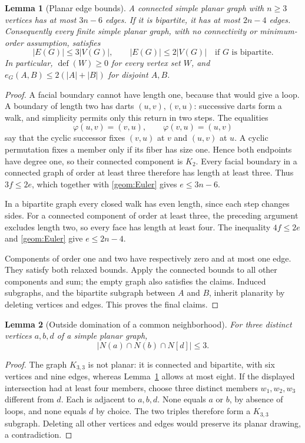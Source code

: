 \documentclass[11pt,a4paper]{article}
\newtheorem{lemma}[lemma]{Lemma}
\theoremstyle{definition}
\theoremstyle{remark}
\DeclareMathOperator{\Def}{def}
\begin{document}
\begin{lemma}[Planar edge bounds]\label{geom:edge-bounds}
A connected simple planar graph with $n\geq3$ vertices has at most $3n-6$
edges. If it is bipartite, it has at most $2n-4$ edges. Consequently every
finite simple planar graph, with no connectivity or minimum-order
assumption, satisfies
\[
 |E(G)|\leq3|V(G)|,\qquad
 |E(G)|\leq2|V(G)|\quad\text{if $G$ is bipartite}.
\]
In particular, $\Def(W)\geq0$ for every vertex set $W$, and
$e_G(A,B)\leq2(|A|+|B|)$ for disjoint $A,B$.
\end{lemma}
\begin{proof}
A facial boundary cannot have length one, because that would give a loop.
A boundary of length two has darts $(u,v),(v,u)$: successive darts form a
walk, and simplicity permits only this return in two steps. The equalities
\[
 \varphi(u,v)=(v,u),\qquad \varphi(v,u)=(u,v)
\]
say that the cyclic successor fixes $(v,u)$ at $v$ and $(u,v)$ at $u$.
A cyclic permutation fixes a member only if its fiber has size one.
Hence both endpoints have degree one, so their connected component is
$K_2$. Every facial boundary in a connected graph of order at least three
therefore has length at least three. Thus $3f\leq2e$, which together with
\eqref{geom:Euler} gives $e\leq3n-6$.

In a bipartite graph every closed walk has even length, since each step
changes sides. For a connected component of order at least three, the
preceding argument excludes length two, so every face has length at least
four. The inequality $4f\leq2e$ and \eqref{geom:Euler} give $e\leq2n-4$.

Components of order one and two have respectively zero and at most one
edge. They satisfy both relaxed bounds. Apply the connected bounds to
all other components and sum; the empty graph also satisfies the claims.
Induced subgraphs, and the bipartite subgraph between $A$ and $B$, inherit
planarity by deleting vertices and edges. This proves the final claims.
\end{proof}

\begin{lemma}[Outside domination of a common neighborhood]
\label{geom:outside-pair}
For three distinct vertices $a,b,d$ of a simple planar graph,
\[
 |N(a)\cap N(b)\cap N[d]|\leq3.
\]
\end{lemma}
\begin{proof}
The graph $K_{3,3}$ is not planar: it is connected and bipartite, with
six vertices and nine edges, whereas Lemma~\ref{geom:edge-bounds} allows
at most eight. If the displayed intersection had at least four members,
choose three distinct members $w_1,w_2,w_3$ different from $d$. Each is
adjacent to $a,b,d$. None equals $a$ or $b$, by absence of loops, and none
equals $d$ by choice. The two triples therefore form a $K_{3,3}$ subgraph.
Deleting all other vertices and edges would preserve its planar drawing,
a contradiction.
\end{proof}
\end{document}

